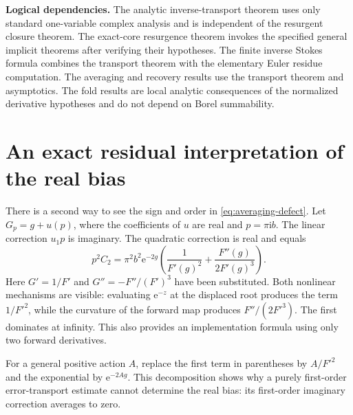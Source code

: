 \documentclass[11pt,a4paper]{article}
\numberwithin{equation}{section}
\theoremstyle{definition}
\theoremstyle{remark}
\newcommand{\e}{\mathrm e}
\newcommand{\ii}{\mathrm i}
\begin{document}
\noindent\textbf{Logical dependencies.} The analytic inverse-transport theorem uses only standard one-variable complex analysis and is independent of the resurgent closure theorem. The exact-core resurgence theorem invokes the specified general implicit theorems after verifying their hypotheses. The finite inverse Stokes formula combines the transport theorem with the elementary Euler residue computation. The averaging and recovery results use the transport theorem and asymptotics. The fold results are local analytic consequences of the normalized derivative hypotheses and do not depend on Borel summability.

\section{An exact residual interpretation of the real bias}
There is a second way to see the sign and order in \eqref{eq:averaging-defect}. Let $G_p=g+u(p)$, where the coefficients of $u$ are real and $p=\pi\ii b$. The linear correction $u_1p$ is imaginary. The quadratic correction is real and equals
\[
 p^2C_2=\pi^2b^2\e^{-2g}
 \left(\frac1{F'(g)^2}+\frac{F''(g)}{2F'(g)^3}\right).
\]
Here $G'=1/F'$ and $G''=-F''/(F')^3$ have been substituted. Both nonlinear mechanisms are visible: evaluating $\e^{-z}$ at the displaced root produces the term $1/F'^2$, while the curvature of the forward map produces $F''/(2F'^3)$. The first dominates at infinity. This also provides an implementation formula using only two forward derivatives.

For a general positive action $A$, replace the first term in parentheses by $A/F'^2$ and the exponential by $\e^{-2Ag}$. This decomposition shows why a purely first-order error-transport estimate cannot determine the real bias: its first-order imaginary correction averages to zero.
\end{document}
